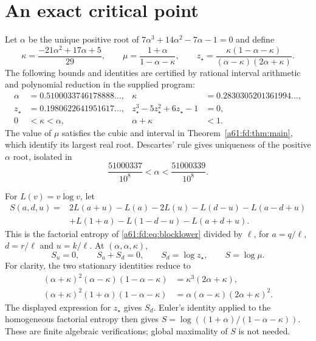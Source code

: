 \documentclass[11pt,letterpaper]{article}
\numberwithin{equation}{section}
\theoremstyle{remark}\newtheorem{remark}[theorem]{Remark}
\newcommand{\st}{\star}
\begin{document}
\section{An exact critical point}
Let $\alpha$ be the unique positive root of $7\alpha^3+14\alpha^2-7\alpha-1=0$ and define
\begin{equation}\label{a61:fd:eq:constants}
 \kappa=\frac{-21\alpha^2+17\alpha+5}{29},\qquad
 \mu=\frac{1+\alpha}{1-\alpha-\kappa},\qquad
 z_\st=\frac{\kappa(1-\alpha-\kappa)}{(\alpha-\kappa)(2\alpha+\kappa)}.
\end{equation}
The following bounds and identities are certified by rational interval arithmetic and polynomial reduction in the supplied program:
\begin{align*}
 \alpha&=0.5100033746178888\ldots,& \kappa&=0.2830305201361994\ldots,\\
 z_\st&=0.1980622641951617\ldots,& z_\st^3-5z_\st^2+6z_\st-1&=0,\\
 0&<\kappa<\alpha,& \alpha+\kappa&<1.
\end{align*}
The value of $\mu$ satisfies the cubic and interval in Theorem~\ref{a61:fd:thm:main}, which identify its largest real root. Descartes' rule gives uniqueness of the positive $\alpha$ root, isolated in
\[
 \frac{51000337}{10^8}<\alpha<\frac{51000339}{10^8}.
\]

For $L(v)=v\log v$, let
\begin{align*}
 S(a,d,u)={}&2L(a+u)-L(a)-2L(u)-L(d-u)-L(a-d+u)\\
 &+L(1+a)-L(1-d-u)-L(a+d+u).
\end{align*}
This is the factorial entropy of \eqref{a61:fd:eq:blocklower} divided by $\ell$, for $a=q/\ell$, $d=r/\ell$ and $u=k/\ell$. At $(\alpha,\alpha,\kappa)$,
\begin{equation}\label{a61:fd:eq:entropy}
 S_u=0,\qquad S_a+S_d=0,\qquad S_d=\log z_\st,\qquad S=\log\mu.
\end{equation}
For clarity, the two stationary identities reduce to
\begin{align*}
 (\alpha+\kappa)^2(\alpha-\kappa)(1-\alpha-\kappa)
 &=\kappa^3(2\alpha+\kappa),\\
 (\alpha+\kappa)^2(1+\alpha)(1-\alpha-\kappa)
 &=\alpha(\alpha-\kappa)(2\alpha+\kappa)^2.
\end{align*}
The displayed expression for $z_\st$ gives $S_d$. Euler's identity applied to the homogeneous factorial entropy then gives $S=\log((1+\alpha)/(1-\alpha-\kappa))$. These are finite algebraic verifications; global maximality of $S$ is not needed.
\end{document}
